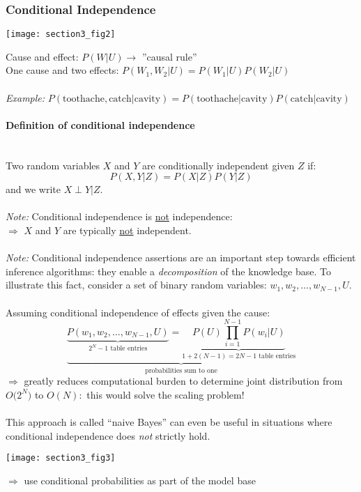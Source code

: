 
\subsubsection{Conditional Independence}
\begin{center} \texttt{[image: section3\_fig2]} \end{center}
Cause and effect: $P(W|U) \rightarrow$ ''causal rule''\\
One cause and two effects: $P(W_1, W_2|U) = P(W_1|U) P(W_2|U)$\\\\
\emph{Example: }$P(\text{toothache}, \text{catch}| \text{cavity})
	= P(\text{toothache}|\text{cavity})
		P(\text{catch}|\text{cavity})$

\paragraph{Definition of conditional independence}\mbox{}\\
Two random variables $X$ and $Y$ are conditionally independent given $Z$ if:
\begin{equation}
	P(X,Y|Z) = P(X|Z) P(Y|Z)
\end{equation}
and we write $X\perp Y |Z$.\\\\
\emph{Note:} Conditional independence is \underline{not} independence:\\
\indent $\Rightarrow$ $X$ and $Y$ are typically \underline{not}
independent.
\\\\
\emph{Note:} Conditional independence assertions are an important step
towards efficient inference algorithms: they enable a 
\emph{decomposition} of the knowledge base. To illustrate this fact,
consider a set of binary random variables: $w_1, w_2, \ldots, w_{N-1},
U$.
\\\\
Assuming conditional independence of effects given the cause:
\begin{equation}
	\underbrace{
		\underbrace{ P(w_1, w_2, \ldots, w_{N-1}, U) }_{
		2^N-1 \text{ table entries}}
		= \underbrace{ P(U) \prod\limits_{i = 1}^{N-1} P(w_i|U) }_{
		1 + 2(N-1) = 2N-1 \text{ table entries}} }_{
			\text{probabilities sum to one}}
\end{equation}
$\Rightarrow$ greatly reduces computational burden to determine joint distribution from $O\big(2^N\big)$ to $O(N):$ this would solve the scaling problem!
\\\\
This approach is called ``naive Bayes'' can even be useful in
situations where conditional independence does \emph{not} strictly hold.
\begin{center} \texttt{[image: section3\_fig3]} \end{center}
$\Rightarrow$ use conditional probabilities as part of the model base
